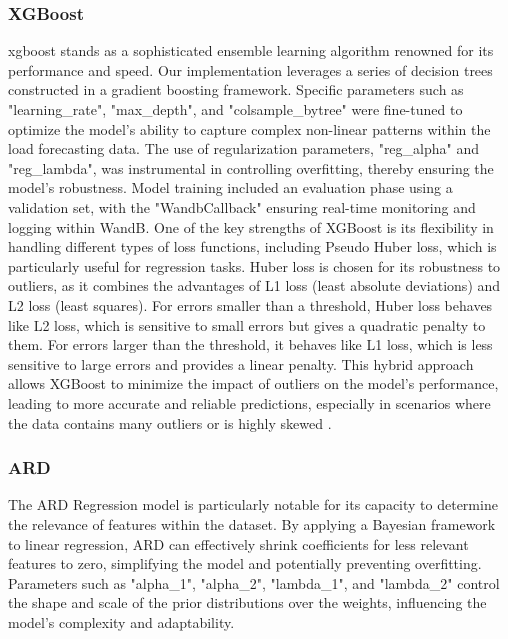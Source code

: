 \documentclass{article} %
\begin{document}
\subsubsection{XGBoost}
\Gls{xgboost} stands as a sophisticated ensemble learning algorithm renowned for its performance and speed. Our implementation leverages a series of decision trees constructed in a gradient boosting framework. Specific parameters such as "learning\_rate", "max\_depth", and "colsample\_bytree" were fine-tuned to optimize the model's ability to capture complex non-linear patterns within the load forecasting data. The use of regularization parameters, "reg\_alpha" and "reg\_lambda", was instrumental in controlling overfitting, thereby ensuring the model's robustness. Model training included an evaluation phase using a validation set, with the "WandbCallback" ensuring real-time monitoring and logging within \gls{WandB}.
One of the key strengths of XGBoost is its flexibility in handling different types of loss functions, including Pseudo Huber loss, which is particularly useful for regression tasks. Huber loss is chosen for its robustness to outliers, as it combines the advantages of L1 loss (least absolute deviations) and L2 loss (least squares). For errors smaller than a threshold, Huber loss behaves like L2 loss, which is sensitive to small errors but gives a quadratic penalty to them. For errors larger than the threshold, it behaves like L1 loss, which is less sensitive to large errors and provides a linear penalty. This hybrid approach allows XGBoost to minimize the impact of outliers on the model's performance, leading to more accurate and reliable predictions, especially in scenarios where the data contains many outliers or is highly skewed \cite{kulisz2024optimizing}.

\subsubsection{ARD}
The \gls{ARD} Regression model is particularly notable for its capacity to determine the relevance of features within the dataset. By applying a Bayesian framework to linear regression, \gls{ARD} can effectively shrink coefficients for less relevant features to zero, simplifying the model and potentially preventing overfitting. Parameters such as "alpha\_1", "alpha\_2", "lambda\_1", and "lambda\_2" control the shape and scale of the prior distributions over the weights, influencing the model's complexity and adaptability. 
\end{document}
